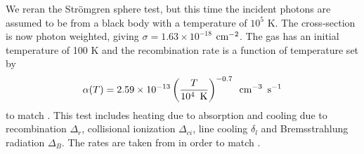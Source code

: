 \documentclass[fleq,usenatbib]{mnras}
\newcommand{\strom}{Str\"omgren}
\begin{document}
{We reran the \strom{} sphere test, but this time the incident photons are 
assumed to be from a black body with a temperature of $10^5$ K. The 
cross-section is now photon weighted, giving 
$\sigma = 1.63 \times 10^{-18}$ $\rm cm^{-2}$. The gas has an initial 
temperature of 100 K and the recombination rate is a function of temperature 
set by
\begin{equation}
\alpha(T) = 2.59 \times 10^{-13} \left( \frac{T}{10^4 \hspace{5pt} 
{\rm K}}\right)^{-0.7} \hspace{5pt} {\rm cm}^{-3} \hspace{5pt} {\rm s}^{-1}
\end{equation}
to match \cite{petkovaSpringel09}. This test includes heating due to 
absorption and cooling due to recombination $\Delta_r$, collisional 
ionization $\Delta_{ci}$, line cooling $\delta_l$ and Bremsstrahlung 
radiation $\Delta_B$. The rates are taken from \cite{cen92} in order to
match \cite{petkovaSpringel09}.

}
\end{document}
